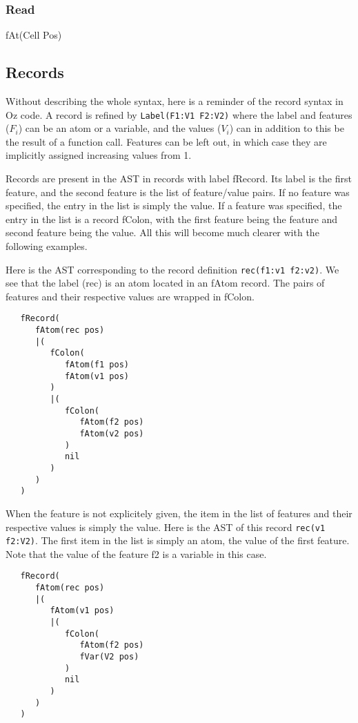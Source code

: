 \documentclass[a4paper]{memoir}
\begin{document}
\subsubsection{Read}
fAt(Cell Pos) %
\subsection{Records}
Without describing the whole syntax, here is a reminder of the record syntax in Oz code. A record is refined by \lstinline!Label(F1:V1 F2:V2)! where the label and features ($F_i$) can be an atom or a variable, and the values ($V_i$) can in addition to this be the result of a function call. Features can be left out, in which case they are implicitly assigned increasing values from 1.

Records are present in the AST in records with label fRecord. Its label is the first feature, and the second feature is the list of feature/value pairs. If no feature was specified, the entry in the list is simply the value. If a feature was specified, the entry in the list is a record fColon, with the first feature being the feature and second feature being the value. All this will become much clearer with the following examples.

Here is the AST corresponding to the record definition \lstinline!rec(f1:v1 f2:v2)!. We see that the label (rec) is an atom located in an fAtom record. The pairs of features and their respective values are wrapped in fColon.

\begin{lstlisting}
   fRecord(
      fAtom(rec pos)
      |(
         fColon(
            fAtom(f1 pos)
            fAtom(v1 pos)
         )
         |(
            fColon(
               fAtom(f2 pos)
               fAtom(v2 pos)
            )
            nil
         )
      )
   )
\end{lstlisting}

When the feature is not explicitely given, the item in the list of features and their respective values is simply the value. Here is the AST of this record \lstinline!rec(v1 f2:V2)!. The first item in the list is simply an atom, the value of the first feature. Note that the value of the feature f2 is a variable in this case.

\begin{lstlisting}
   fRecord(
      fAtom(rec pos)
      |(
         fAtom(v1 pos)
         |(
            fColon(
               fAtom(f2 pos)
               fVar(V2 pos)
            )
            nil
         )
      )
   )
\end{lstlisting}
\end{document}
